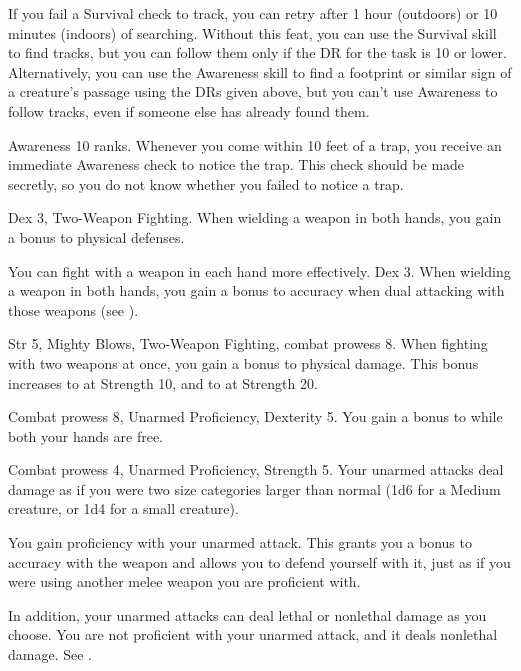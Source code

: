 If you fail a Survival check to track, you can retry after 1 hour (outdoors) or 10 minutes (indoors) of searching.
Without this feat, you can use the Survival skill to find tracks, but you can follow them only if the DR for the task is 10 or lower.
Alternatively, you can use the Awareness skill to find a footprint or similar sign of a creature's passage using the DRs given above, but you can't use Awareness to follow tracks, even if someone else has already found them.

\featpre Awareness 10 ranks.
\featben Whenever you come within 10 feet of a trap, you receive an immediate Awareness check to notice the trap.
This check should be made secretly, so you do not know whether you failed to notice a trap.

\featpres Dex 3, Two-Weapon Fighting.
\featben When wielding a weapon in both hands, you gain a  bonus to physical defenses.

You can fight with a weapon in each hand more effectively.
\featpre Dex 3.
\featben When wielding a weapon in both hands, you gain a  bonus to accuracy when dual attacking with those weapons (see ).

\featpres Str 5, Mighty Blows, Two-Weapon Fighting, combat prowess 8.
\featben When fighting with two weapons at once, you gain a  bonus to physical damage.
This bonus increases to  at Strength 10, and to  at Strength 20.

\featpres Combat prowess 8, Unarmed Proficiency, Dexterity 5.
\featben You gain a  bonus to  while both your hands are free.

\featpres Combat prowess 4, Unarmed Proficiency, Strength 5.
\featben Your unarmed attacks deal damage as if you were two size categories larger than normal (1d6 for a Medium creature, or 1d4 for a small creature).

\featben You gain proficiency with your unarmed attack.
This grants you a  bonus to accuracy with the weapon and allows you to defend yourself with it, just as if you were using another melee weapon you are proficient with.

In addition, your unarmed attacks can deal lethal or nonlethal damage as you choose.
 You are not proficient with your unarmed attack, and it deals nonlethal damage. See .

